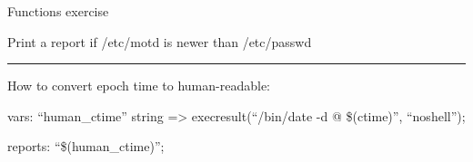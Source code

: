 \begin{codelisting}
\end{codelisting}





Functions exercise

Print a report if /etc/motd is newer than /etc/passwd

\begin{center}
\rule{3in}{0.4pt}
\end{center}

How to convert epoch time to human-readable:

vars:
  ``human\_ctime''
     string =\textgreater{} execresult(``/bin/date -d @ \$(ctime)'', ``noshell'');

reports:
  ``\$(human\_ctime)'';